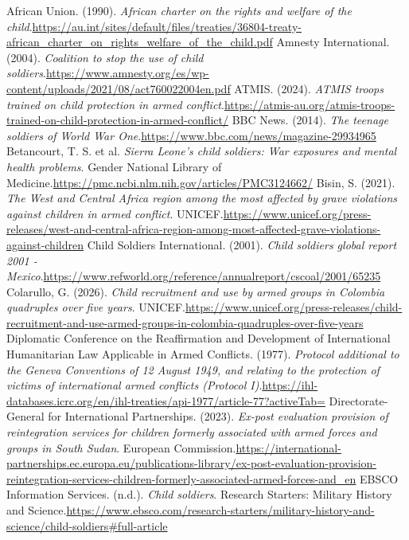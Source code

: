 
\begin{referencelist}
   African Union. (1990). \emph{African charter on the rights and welfare of the child}.\url{https://au.int/sites/default/files/treaties/36804-treaty-african_charter_on_rights_welfare_of_the_child.pdf}
   Amnesty International. (2004). \emph{Coalition to stop the use of child soldiers}.\url{https://www.amnesty.org/es/wp-content/uploads/2021/08/act760022004en.pdf}
   ATMIS. (2024). \emph{ATMIS troops trained on child protection in armed conflict}.\url{https://atmis-au.org/atmis-troops-trained-on-child-protection-in-armed-conflict/}
   BBC News. (2014). \emph{The teenage soldiers of World War One}.\url{https://www.bbc.com/news/magazine-29934965}
   Betancourt, T. S. et al. \emph{Sierra Leone’s child soldiers: War exposures and mental health problems}. Gender National Library of Medicine.\url{https://pmc.ncbi.nlm.nih.gov/articles/PMC3124662/}
   Bisin, S. (2021). \emph{The West and Central Africa region among the most affected by grave violations against children in armed conflict}. UNICEF.\url{https://www.unicef.org/press-releases/west-and-central-africa-region-among-most-affected-grave-violations-against-children}
   Child Soldiers International. (2001). \emph{Child soldiers global report 2001 - Mexico}.\url{https://www.refworld.org/reference/annualreport/cscoal/2001/65235}
   Colarullo, G. (2026). \emph{Child recruitment and use by armed groups in Colombia quadruples over five years}. UNICEF.\url{https://www.unicef.org/press-releases/child-recruitment-and-use-armed-groups-in-colombia-quadruples-over-five-years}
   Diplomatic Conference on the Reaffirmation and Development of International Humanitarian Law Applicable in Armed Conflicts. (1977). \emph{Protocol additional to the Geneva Conventions of 12 August 1949, and relating to the protection of victims of international armed conflicts (Protocol I)}.\url{https://ihl-databases.icrc.org/en/ihl-treaties/api-1977/article-77?activeTab=}
   Directorate-General for International Partnerships. (2023). \emph{Ex-post evaluation provision of reintegration services for children formerly associated with armed forces and groups in South Sudan}. European Commission.\url{https://international-partnerships.ec.europa.eu/publications-library/ex-post-evaluation-provision-reintegration-services-children-formerly-associated-armed-forces-and_en}
   EBSCO Information Services. (n.d.). \emph{Child soldiers}. Research Starters: Military History and Science.\url{https://www.ebsco.com/research-starters/military-history-and-science/child-soldiers\#full-article}

\end{referencelist}
